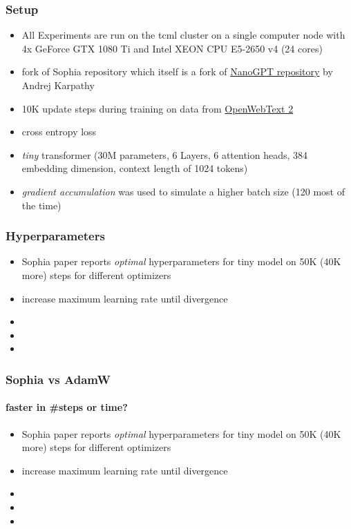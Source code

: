 \documentclass[
	11pt, %
	aspectratio=169, %
]{beamer}
\begin{document}
 \begin{frame}
	\frametitle{Setup}
	\begin{itemize}
		\item All Experiments are run on the tcml cluster on a single computer node with 4x GeForce GTX 1080 Ti and Intel XEON CPU E5-2650 v4 (24 cores)
		\item fork of Sophia repository which itself is a fork of \href{https://github.com/karpathy/nanoGPT/tree/master}{NanoGPT repository} by Andrej Karpathy
		\item 10K update steps during training on data from \href{https://openwebtext2.readthedocs.io/en/latest/}{OpenWebText 2}
		\item cross entropy loss 
		\item \textit{tiny} transformer (30M parameters, 6 Layers, 6 attention heads, 384 embedding dimension, context length of 1024 tokens)
		\item \textit{gradient accumulation} was used to simulate a higher batch size (120 most of the time)
	\end{itemize}
\end{frame}


 \begin{frame}
	\frametitle{Hyperparameters}
	\begin{itemize}
		\item Sophia paper reports \textit{optimal} hyperparameters for tiny model on 50K (40K more) steps for different optimizers
		\item increase maximum learning rate until divergence
		\item 
		\item
		\item
	\end{itemize}
\end{frame}

 \begin{frame}
	\frametitle{Sophia vs AdamW}
	\framesubtitle{faster in \#steps or time?}
	\begin{itemize}
		\item Sophia paper reports \textit{optimal} hyperparameters for tiny model on 50K (40K more) steps for different optimizers
		\item increase maximum learning rate until divergence
		\item 
		\item
		\item
	\end{itemize}
\end{frame}
\end{document}
